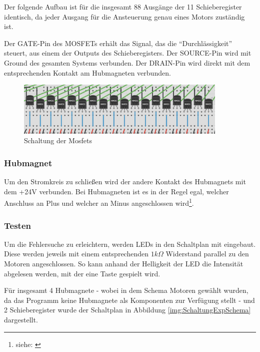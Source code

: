 Der folgende Aufbau ist für die insgesamt 88 Ausgänge der 11 Schieberegister identisch, da jeder Ausgang für die Ansteuerung genau eines Motors zuständig ist.

Der GATE-Pin des MOSFETs erhält das Signal, das die \enquote{Durchlässigkeit} steuert, aus einem der Outputs des Schieberegisters.
Der SOURCE-Pin wird mit Ground des gesamten Systems verbunden.
Der DRAIN-Pin wird direkt mit dem entsprechenden Kontakt am Hubmagneten verbunden.

\begin{figure}[htbp]
	\centering
	\includegraphics[width=0.9\textwidth]{img/MosSchaltung}
	\caption{Schaltung der Mosfets}
	\label{fig:SchaltungMosfet}
\end{figure}

\subsubsection{Hubmagnet}

Um den Stromkreis zu schließen wird der andere Kontakt des Hubmagnets mit dem +24V verbunden.
Bei Hubmagneten ist es in der Regel egal, welcher Anschluss an Plus und welcher an Minus angeschlossen wird\footnote{siehe: \cite*[]{SolenoidDesign}}.

\subsubsection{Testen}

Um die Fehlersuche zu erleichtern, werden LEDs in den Schaltplan mit eingebaut.
Diese werden jeweils mit einem entsprechenden $1k\Omega$ Widerstand parallel zu den Motoren angeschlossen.
So kann anhand der Helligkeit der LED die Intensität abgelesen werden, mit der eine Taste gespielt wird.

Für insgesamt 4 Hubmagnete - wobei in dem Schema Motoren gewählt wurden, da das Programm keine Hubmagnete als Komponenten zur Verfügung stellt - und 2 Schieberegister wurde der Schaltplan in Abbildung \ref{img:SchaltungExpSchema} dargestellt.

